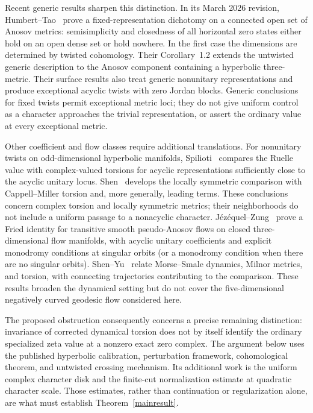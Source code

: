 \documentclass[11pt,letterpaper,reqno]{amsart}
\theoremstyle{remark}
\begin{document}
Recent generic results sharpen this distinction. In its March 2026
revision, Humbert--Tao~\cite{HT26} prove a fixed-representation
dichotomy on a connected open set of Anosov metrics: semisimplicity and
closedness of all horizontal zero states either hold on an open dense
set or hold nowhere. In the first case the dimensions are determined
by twisted cohomology. Their Corollary~1.2 extends the untwisted
generic description to the Anosov component containing a hyperbolic
three-metric. Their surface results also treat generic nonunitary
representations and produce exceptional acyclic twists with zero
Jordan blocks. Generic conclusions for fixed twists permit exceptional
metric loci; they do not give uniform control as a character approaches
the trivial representation, or assert the ordinary value at every
exceptional metric.

Other coefficient and flow classes require additional translations.
For nonunitary twists on odd-dimensional hyperbolic manifolds,
Spilioti~\cite{Spilioti25} compares the Ruelle value with
complex-valued torsions for acyclic representations sufficiently close
to the acyclic unitary locus. Shen~\cite{ShenComplex} develops the
locally symmetric comparison with Cappell--Miller torsion and, more
generally, leading terms. These conclusions concern complex torsion
and locally symmetric metrics; their neighborhoods do not include a
uniform passage to a nonacyclic character. J\'ez\'equel--Zung~\cite{JZ24}
prove a Fried identity for transitive smooth pseudo-Anosov flows on
closed three-dimensional flow manifolds, with acyclic unitary
coefficients and explicit monodromy conditions at singular orbits
(or a monodromy condition when there are no singular orbits).
Shen--Yu~\cite{ShenYu} relate Morse--Smale dynamics, Milnor metrics,
and torsion, with connecting trajectories contributing to the
comparison. These results broaden the dynamical setting but do not
cover the five-dimensional negatively curved geodesic flow considered
here.

The proposed obstruction consequently concerns a precise remaining
distinction: invariance of corrected dynamical torsion does not by
itself identify the ordinary specialized zeta value at a nonzero exact
zero complex. The argument below uses the published hyperbolic
calibration, perturbation framework, cohomological theorem, and
untwisted crossing mechanism. Its additional work is the uniform
complex character disk and the finite-cut normalization estimate at
quadratic character scale. Those estimates, rather than continuation
or regularization alone, are what must establish
Theorem~\ref{mainresult}.
\end{document}

